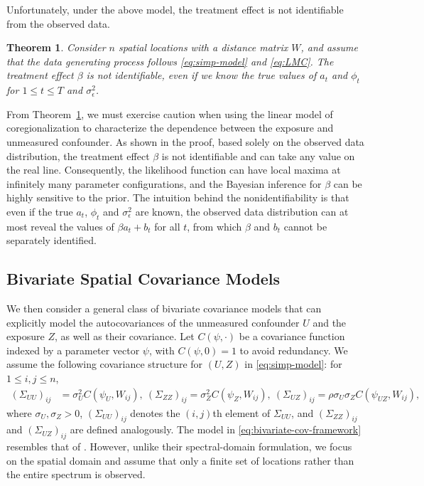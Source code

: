 \documentclass[11pt]{article}
\newtheorem{theorem}{Theorem}
\theoremstyle{definition}
\theoremstyle{remark}
\begin{document}
Unfortunately, under the above model, the treatment effect is not identifiable from the observed data. 



\begin{theorem}\label{thm:lmcoreg-nonid}
Consider $n$ spatial locations with a distance matrix $W$, 
and assume that the data generating process follows \eqref{eq:simp-model} and \eqref{eq:LMC}. 
The treatment effect $\beta$ is not identifiable, 
even if we know the true values of $a_t$ and $\phi_t$ for $1\le t \le T$ and $\sigma^2_{\epsilon}$. 
\end{theorem}




From Theorem~\ref{thm:lmcoreg-nonid}, we must exercise caution when using the linear model of coregionalization to characterize the dependence between the exposure and unmeasured confounder.
As shown in the proof, based solely on the observed data distribution, the treatment effect $\beta$ is not identifiable and can take any value on the real line.
Consequently, the likelihood function 
can have 
local maxima at infinitely many parameter configurations, 
and the Bayesian inference for $\beta$ can be highly sensitive to the prior. The intuition behind the nonidentifiability is that even if the true $a_t$, $\phi_t$ and $\sigma^2_{\epsilon}$ are known, the observed data distribution can at most reveal the values of $\beta a_t + b_t$ for all $t$, from which $\beta$ and $b_t$ cannot be separately identified.





\subsection{Bivariate Spatial Covariance Models}\label{sec:bivariate_spatial}
We then consider a general class of bivariate covariance models that can explicitly model the autocovariances of the unmeasured confounder $U$ and the exposure $Z$, as well as their covariance. 
Let $C(\psi, \cdot)$ be a 
covariance 
function indexed by a parameter vector $\psi$, 
with $C(\psi, 0)=1$ to avoid redundancy. 
We assume the following covariance structure for $(U, Z)$ in \eqref{eq:simp-model}: for $1 \le i,j \le n$,
\begin{align}\label{eq:bivariate-cov-framework}
(\Sigma_{UU})_{ij} &= \sigma_U^2 C(\psi_U, W_{ij}), \ (\Sigma_{ZZ})_{ij} = \sigma_Z^2 C(\psi_Z, W_{ij}), \ 
(\Sigma_{UZ})_{ij} = \rho \sigma_U \sigma_Z C(\psi_{UZ}, W_{ij}),
\end{align}  
where $\sigma_U, \sigma_Z > 0$,
$(\Sigma_{UU})_{ij}$ denotes the $(i,j)$th element of $\Sigma_{UU}$,
and $(\Sigma_{ZZ})_{ij}$ and $(\Sigma_{UZ})_{ij}$ are defined analogously.
The model in \eqref{eq:bivariate-cov-framework} resembles that of \citet{guan2023spectral}.
However, unlike their spectral-domain formulation, we focus on the spatial domain and assume that only a finite set of locations rather than the entire spectrum is observed.
\end{document}
